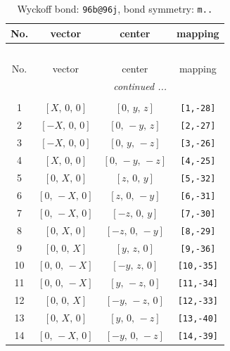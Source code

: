 \documentclass[fleqn,8pt]{jsarticle}
\begin{document}
\begin{longtable}{cccc}
\caption{Wyckoff bond: {\tt 96b@96j}, bond symmetry: {\tt m..}}
 \\
 \hline \hline
No. & vector & center & mapping \\ \hline \endfirsthead

\multicolumn{3}{l}{\tablename\ \thetable{}} \\
 \hline \hline
No. & vector & center & mapping \\ \hline \endhead

 \hline \hline
\multicolumn{3}{r}{\footnotesize\it continued ...} \\ \endfoot

 \hline \hline
\multicolumn{3}{r}{} \\ \endlastfoot

1 & $\left[ X,\, 0,\, 0 \right]$ & $\left[ 0,\, y,\, z \right]$ & {\tt [1,-28]} \\ \hline
2 & $\left[ - X,\, 0,\, 0 \right]$ & $\left[ 0,\, - y,\, z \right]$ & {\tt [2,-27]} \\ \hline
3 & $\left[ - X,\, 0,\, 0 \right]$ & $\left[ 0,\, y,\, - z \right]$ & {\tt [3,-26]} \\ \hline
4 & $\left[ X,\, 0,\, 0 \right]$ & $\left[ 0,\, - y,\, - z \right]$ & {\tt [4,-25]} \\ \hline
5 & $\left[ 0,\, X,\, 0 \right]$ & $\left[ z,\, 0,\, y \right]$ & {\tt [5,-32]} \\ \hline
6 & $\left[ 0,\, - X,\, 0 \right]$ & $\left[ z,\, 0,\, - y \right]$ & {\tt [6,-31]} \\ \hline
7 & $\left[ 0,\, - X,\, 0 \right]$ & $\left[ - z,\, 0,\, y \right]$ & {\tt [7,-30]} \\ \hline
8 & $\left[ 0,\, X,\, 0 \right]$ & $\left[ - z,\, 0,\, - y \right]$ & {\tt [8,-29]} \\ \hline
9 & $\left[ 0,\, 0,\, X \right]$ & $\left[ y,\, z,\, 0 \right]$ & {\tt [9,-36]} \\ \hline
10 & $\left[ 0,\, 0,\, - X \right]$ & $\left[ - y,\, z,\, 0 \right]$ & {\tt [10,-35]} \\ \hline
11 & $\left[ 0,\, 0,\, - X \right]$ & $\left[ y,\, - z,\, 0 \right]$ & {\tt [11,-34]} \\ \hline
12 & $\left[ 0,\, 0,\, X \right]$ & $\left[ - y,\, - z,\, 0 \right]$ & {\tt [12,-33]} \\ \hline
13 & $\left[ 0,\, X,\, 0 \right]$ & $\left[ y,\, 0,\, - z \right]$ & {\tt [13,-40]} \\ \hline
14 & $\left[ 0,\, - X,\, 0 \right]$ & $\left[ - y,\, 0,\, - z \right]$ & {\tt [14,-39]} \\ \hline

\end{longtable}
\end{document}
